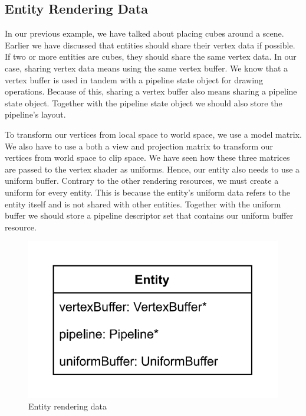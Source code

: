 \subsection{Entity Rendering Data}

In our previous example, we have talked about placing cubes around a scene.
Earlier we have discussed that entities should share their vertex data if possible.
If two or more entities are cubes, they should share the same vertex data.
In our case, sharing vertex data means using the same vertex buffer.
We know that a vertex buffer is used in tandem with a pipeline state object for
drawing operations.
Because of this, sharing a vertex buffer also means sharing a pipeline state
object.
Together with the pipeline state object we should also store the pipeline's layout.

To transform our vertices from local space to world space, we use a model matrix.
We also have to use a both a view and projection matrix to transform our vertices
from world space to clip space.
We have seen how these three matrices are passed to the vertex shader as uniforms.
Hence, our entity also needs to use a uniform buffer.
Contrary to the other rendering resources, we must create a uniform for every
entity.
This is because the entity's uniform data refers to the entity itself and is not
shared with other entities.
Together with the uniform buffer we should store a pipeline descriptor set that
contains our uniform buffer resource.

\begin{figure}[ht]
    \centering
    \includegraphics[scale=0.40]{images/ChScene/EntityRenderingData.png}
    \caption{Entity rendering data}
    \label{fig::EntityRenderingData}
\end{figure}

